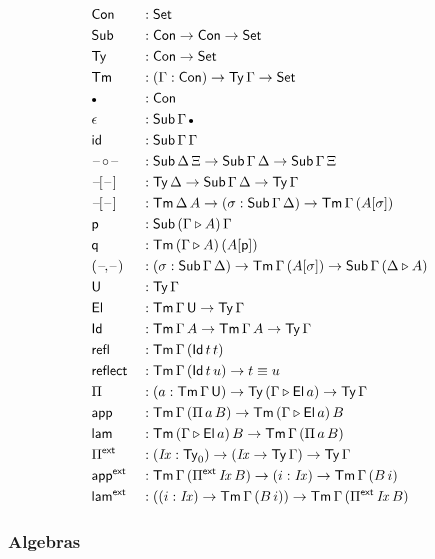 \documentclass[12pt,a4paper,twoside,openany]{book}
\theoremstyle{remark}
\theoremstyle{definition}
\theoremstyle{theorem}
\newcommand{\mi}[1]{\mathit{#1}}
\newcommand{\ms}[1]{\mathsf{#1}}
\newcommand{\refl}{\mathsf{refl}}
\newcommand{\reflect}{\mathsf{reflect}}
\newcommand{\id}{\mathsf{id}}
\newcommand{\Con}{\mathsf{Con}}
\newcommand{\Sub}{\mathsf{Sub}}
\newcommand{\Tm}{\mathsf{Tm}}
\newcommand{\Ty}{\mathsf{Ty}}
\newcommand{\U}{\mathsf{U}}
\newcommand{\El}{\mathsf{El}}
\newcommand{\Id}{\mathsf{Id}}
\newcommand{\blank}{\mathord{\hspace{1pt}\text{--}\hspace{1pt}}}
\newcommand{\Set}{\mathsf{Set}}
\newcommand{\ext}{\triangleright}
\newcommand{\emptycon}{\scaleobj{.75}\bullet}
\newcommand{\Pie}{\Pi^{\mathsf{ext}}}
\newcommand{\appe}{\mathsf{app^{ext}}}
\newcommand{\lame}{\mathsf{lam^{ext}}}
\newcommand{\p}{\mathsf{p}}
\newcommand{\q}{\mathsf{q}}
\newcommand{\app}{\ms{app}}
\newcommand{\lam}{\ms{lam}}
\begin{document}
\begin{alignat*}{3}
  &\Con &&: \Set\\
  &\Sub &&: \Con \to \Con \to \Set\\
  &\Ty  &&: \Con \to \Set\\
  &\Tm  &&: (\Gamma : \Con) \to \Ty\,\Gamma \to \Set \\
  &\emptycon &&: \Con\\
  &\epsilon &&: \Sub\,\Gamma\,\emptycon\\
  &\id &&: \Sub\,\Gamma\,\Gamma\\
  &\blank\!\circ\!\blank &&: \Sub\,\Delta\,\Xi \to \Sub\,\Gamma\,\Delta \to \Sub\,\Gamma\,\Xi\\
  &\blank\![\blank] &&: \Ty\,\Delta \to \Sub\,\Gamma\,\Delta \to \Ty\,\Gamma\\
  &\blank\![\blank] &&: \Tm\,\Delta\,A \to (\sigma : \Sub\,\Gamma\,\Delta) \to \Tm\,\Gamma\,(A[\sigma])\\
  &\p &&: \Sub\,(\Gamma\ext A)\,\Gamma\\
  &\q &&: \Tm\,(\Gamma\ext A)\,(A[\p])\\
  &(\blank\!,\!\blank) &&: (\sigma : \Sub\,\Gamma\,\Delta) \to \Tm\,\Gamma\,(A[\sigma]) \to \Sub\,\Gamma\,(\Delta\ext A)\\
  &\U &&: \Ty\,\Gamma\\
  &\El &&: \Tm\,\Gamma\,\U \to \Ty\,\Gamma\\
  &\Id &&: \Tm\,\Gamma\,A \to \Tm\,\Gamma\,A \to \Ty\,\Gamma\\
  &\refl &&: \Tm\,\Gamma\,(\Id\,t\,t)\\
  &\reflect &&: \Tm\,\Gamma\,(\Id\,t\,u) \to t \equiv u\\
  &\Pi &&: (a : \Tm\,\Gamma\,\U) \to \Ty\,(\Gamma\ext \El\,a) \to \Ty\,\Gamma\\
  &\app &&: \Tm\,\Gamma\,(\Pi\,a\,B) \to \Tm\,(\Gamma \ext \El\,a)\,B\\
  &\lam &&: \Tm\,(\Gamma \ext \El\,a)\,B \to \Tm\,\Gamma\,(\Pi\,a\,B)\\
  &\Pie &&: (\mi{Ix} : \Ty_0) \to (\mi{Ix} \to \Ty\,\Gamma) \to \Ty\,\Gamma\\
  &\appe &&: \Tm\,\Gamma\,(\Pie\,\mi{Ix}\,B) \to (i : \mi{Ix}) \to \Tm\,\Gamma\,(B\,i)\\
  &\lame &&: ((i : \mi{Ix}) \to \Tm\,\Gamma\,(B\,i)) \to \Tm\,\Gamma\,(\Pie\,\mi{Ix}\,B)
\end{alignat*}

\subsubsection{Algebras}
\end{document}
